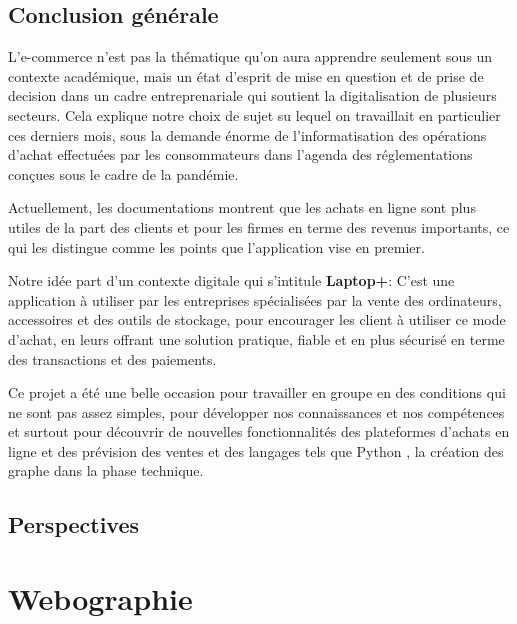 \documentclass[a4paper]{report}
\begin{document}
\begin{doublespace}
\begin{doublespace}
\begin{doublespace}
\begin{doublespace}
\begin{doublespace}
\begin{doublespace}
                        \section{Conclusion générale}
                        L'e-commerce n'est pas la thématique qu'on aura apprendre seulement sous un contexte académique, mais un état d'esprit de mise en question et de prise de decision dans un cadre entreprenariale qui soutient la digitalisation de plusieurs secteurs. Cela explique notre choix de sujet su lequel on travaillait en particulier ces derniers mois, sous la demande énorme de l'informatisation des opérations d'achat effectuées par les consommateurs dans l'agenda des réglementations conçues sous le cadre de la pandémie.

                        Actuellement, les documentations montrent que les achats en ligne sont plus utiles de la part des clients et pour les firmes en terme des revenus importants, ce qui les distingue comme les points que  l'application vise en premier.

                        Notre idée part d'un contexte digitale qui s'intitule \textbf{Laptop+}: C’est une application à utiliser par les entreprises spécialisées par la vente des ordinateurs, accessoires et des outils de stockage, pour encourager les client à utiliser ce mode d'achat, en leurs offrant une solution pratique, fiable et en plus  sécurisé en terme des transactions et des paiements.

                        Ce projet a été une belle occasion pour travailler en groupe en des conditions qui ne sont pas assez simples, pour développer nos
                        connaissances et nos compétences et surtout pour découvrir de nouvelles fonctionnalités des plateformes d'achats en ligne et des prévision des ventes et des langages tels que Python , la création des graphe dans la phase technique.
                        \section{Perspectives}
                        \chapter{Webographie}
                        \fancyhead[L]{\hspace*{5cm}}

\end{doublespace}
\end{doublespace}
\end{doublespace}
\end{doublespace}
\end{doublespace}
\end{doublespace}
\end{document}
